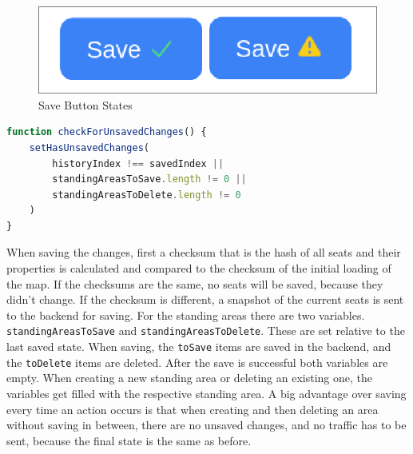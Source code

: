 \begin{figure}
    \centering
    \includegraphics[scale=0.4]{pics/save-button-states.png}
    \caption{Save Button States}
    \label{fig:save-button-states}
\end{figure}

\begin{lstlisting}[language=TypeScript, caption=Check for Unsaved Changes, label=lst:check-unsaved-changes]
function checkForUnsavedChanges() {
    setHasUnsavedChanges(
        historyIndex !== savedIndex ||
        standingAreasToSave.length != 0 ||
        standingAreasToDelete.length != 0
    )
}
\end{lstlisting}

When saving the changes, first a checksum that is the hash of all seats and their properties is calculated and compared to the checksum of the initial loading of the map. If the checksums are the same, no seats will be saved, because they didn't change. If the checksum is different, a snapshot of the current seats is sent to the backend for saving. For the standing areas there are two variables. \texttt{standingAreasToSave} and \texttt{standingAreasToDelete}. These are set relative to the last saved state. When saving, the \texttt{toSave} items are saved in the backend, and the \texttt{toDelete} items are deleted. After the save is successful both variables are empty. When creating a new standing area or deleting an existing one, the variables get filled with the respective standing area. A big advantage over saving every time an action occurs is that when creating and then deleting an area without saving in between, there are no unsaved changes, and no traffic has to be sent, because the final state is the same as before.